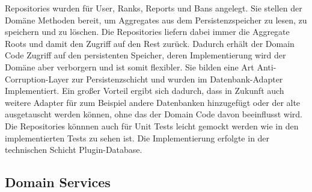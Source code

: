 
Repositories wurden für User, Ranks, Reports und Bans angelegt.
Sie stellen der Domäne Methoden bereit, um Aggregates aus dem Persistenzspeicher zu lesen, zu speichern und zu löschen.
Die Repositories liefern dabei immer die Aggregate Roots und damit den Zugriff auf den Rest zurück.
Dadurch erhält der Domain Code Zugriff auf den persistenten Speicher, deren Implementierung wird der Domäne aber verborgern und ist somit flexibler.
Sie bilden eine Art Anti-Corruption-Layer zur Persistenzschicht und wurden im Datenbank-Adapter Implementiert.
Ein großer Vorteil ergibt sich dadurch, dass in Zukunft auch weitere Adapter für zum Beispiel andere Datenbanken hinzugefügt oder der alte ausgetauscht werden können,
ohne das der Domain Code davon beeinflusst wird.
Die Repositories könnnen auch für Unit Tests leicht gemockt werden wie in den implementierten Tests zu sehen ist.
Die Implementierung erfolgte in der technischen Schicht Plugin-Database.




\newpage
\subsection{Domain Services}

